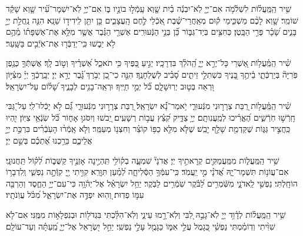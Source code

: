 \documentclass[twoside, openany, parskip=half, 11pt]{book}
\begin{document}
שִׁ֥יר הַֽמַּֽעֲל֗וֹת לִשְׁלֹ֫מֹ֥ה אִם־יְיָ֤ לֹֽא־יִבְנֶ֬ה בַ֗יִת שָׁ֤וְא עָֽמְֿל֣וּ בוֹנָ֣יו בּ֑וֹ אִם־יְיָ֥ לֹֽא־יִשְׁמָר־עִ֝֗יר שָׁ֤וְא שָׁקַ֬ד שׁוֹמֵֽר׃ שָׁ֤וְא לָכֶ֨ם מַשְׁכִּ֑ימֵי ק֡וּם מְאַֽחֲרֵי־שֶׁ֗בֶת אֹֽ֭כְֿלֵי לֶ֣חֶם הָֽעֲצָבִ֑ים כֵּ֤ן יִתֵּ֖ן לִֽידִיד֣וֹ שֵׁנָֽא׃ הִנֵּ֤ה נַֽחֲלַ֣ת יְיָ֣ בָּנִ֑ים שָׂ֝כָ֗ר פְּרִ֣י הַבָּֽטֶן׃ כְּחִצִּ֥ים בְּיַד־גִּבּ֑וֹר כֵּ֝֗ן בְּנֵ֣י הַנְּֿעוּרִֽים׃ אַשְׁרֵ֤י הַגֶּ֗בֶר אֲשֶׁ֤ר מִלֵּ֥א אֶת־אַשְׁפָּת֗וֹ מֵ֫הֶ֥ם לֹ֥א יֵב֑שׁוּ כִּֽי־יְדַבְּֿר֖וּ אֶת־אֹֽיְֿבִ֣ים בַּשָּֽׁעַר׃

 שִׁ֗יר הַֽמַּֽ֫עֲל֥וֹת אַ֭שְׁרֵי כָּל־יְרֵ֣א יְיָ֑ הַֽ֝הֹלֵ֗ךְ בִּדְרָכָֽיו׃ יְגִ֣יעַ כַּ֭פֶּיךָ כִּ֥י תֹאכֵ֑ל אַ֝שְׁרֶ֗יךָ וְט֣וֹב לָֽךְ׃ אֶשְׁתְּֿךָ֤ כְּגֶ֥פֶן פֹּֽרִיָּה֘ בְּיַרְכְּֿתֵ֢י בֵ֫יתֶ֥ךָ בָּ֭נֶיךָ כִּשְׁתִלֵ֣י זֵיתִ֑ים סָ֝בִ֗יב לְשֻׁלְחָנֶֽךָ׃ הִנֵּ֣ה כִי־כֵ֭ן יְבֹ֥רַךְ ֝גָּ֗בֶר יְרֵ֣א יְיָ׃ יְבָֽרֶכְֿךָ֥ יְיָ֗ מִצִּ֫יּ֥וֹן וּ֭רְאֵה בְּט֣וּב יְרֽוּשָׁלָ֑םִ כֹּ֝֗ל יְמֵ֣י חַיֶּֽיךָ׃ וּרְאֵֽה־בָנִ֥ים לְבָנֶ֑יךָ שָׁ֝ל֗וֹם עַל־יִשְׂרָאֵֽל׃

 שִׁ֗יר הַֽמַּֽ֫עֲל֥וֹת רַ֭בַּת צְרָר֣וּנִי מִנְּֿעוּרַ֑י יֹ֥אמַר־נָ֝֗א יִשְׂרָאֵֽל׃ רַ֭בַּת צְרָר֣וּנִי מִנְּֿעוּרָ֑י גַּ֝֗ם לֹ֣א יָכְֿלוּ־לִֽי׃ עַל־גַּ֭בִּי חָֽרְֿשׁ֣וּ חֹֽרְֿשִׁ֑ים הֶ֝אֱרִ֗יכוּ לְמַֽעֲנִותָֽם׃ יְיָ֥ צַדִּ֑יק קִ֝צֵּ֗ץ עֲב֣וֹת רְשָׁעִֽים׃ יֵ֭בשׁוּ וְיִסֹּגוּ֣ אָח֑וֹר כֹּ֝֗ל שֽׂנְֿאֵ֥י צִיּֽוֹן׃ יִֽ֭הְיוּ כַּֽחֲצִ֣יר גַּגּ֑וֹת שֶׁקַּדְמַ֖ת שָׁלַ֣ף יָבֵֽשׁ׃ שֶׁלֹּ֤א מִלֵּ֖א כַפּ֥וֹ קוֹצֵ֗ר וְחִצְנ֥וֹ מְעַמֵּֽר׃ וְלֹ֤א אָֽמְֿר֨וּ הָעֹֽבְֿרִ֗ים בִּרְכַּ֣ת יְיָ֣ אֲלֵיכֶ֑ם בֵּרַ֥כְנוּ אֶ֝תְכֶ֗ם בְּשֵׁ֣ם יְיָ׃

 שִׁ֥יר הַֽמַּֽעֲל֑וֹת מִמַּֽעֲמַקִּ֖ים קְרָאתִ֣יךָ יְיָ׃ אֲדֹנָי֘ שִׁמְעָ֢ה בְק֫וֹלִ֥י תִּֽהְיֶ֣ינָה אָזְנֶ֣יךָ קַשֻּׁב֑וֹת לְ֝ק֗וֹל תַּֽחֲנוּנָֽי׃ אִם־עֲוֹנ֥וֹת תִּשְׁמָר־יָ֑הּ אֲ֝דֹנָ֗י מִ֣י יַֽעֲמֹֽד׃ כִּֽי־עִמְּֿךָ֥ הַסְּֿלִיחָ֑ה לְ֝מַ֗עַן תִּוָּרֵֽא׃ קִוִּ֣יתִי יְ֖יָ קִוְּֿתָ֣ה נַפְשִׁ֑י וְֽלִדְבָר֥וֹ הוֹחָֽלְתִּי׃ נַפְשִׁ֣י לַֽאדֹנָ֑י מִשֹּֽֿׁמְרִ֥ים לַ֝בֹּ֗קֶר שֹֽׁמְֿרִ֥ים לַבֹּֽקֶר׃ יַחֵ֥ל יִשְׂרָאֵ֗ל אֶל־יְהֹ֫וָ֥ה כִּי־עִם־יְיָ֥ הַחֶ֑סֶד וְהַרְבֵּ֖ה עִמּ֣וֹ פְדֽוּת׃ וְ֭הֽוּא יִפְדֶּ֣ה אֶת־יִשְׂרָאֵ֑ל מִ֝כֹּ֗ל עֲוֹֽנֹתָֽיו׃

 שִׁ֥יר הַֽמַּֽעֲל֗וֹת לְדָ֫וִ֥ד יְיָ֤ לֹֽא־גָבַ֣הּ לִ֭בִּי וְלֹֽא־רָ֣מוּ עֵינַ֑י וְלֹֽא־הִלַּ֓כְתִּי בִּגְדֹל֖וֹת וּבְנִפְלָא֣וֹת מִמֶּֽנִּי׃ אִם־לֹ֤א שִׁוִּ֨יתִי וְדֽוֹמַ֗מְתִּי נַפְשִׁ֥֗י כְּ֭גָמֻל עֲלֵ֣י אִמּ֑וֹ כַּגָּמֻ֖ל עָלַ֣י נַפְשִֽׁי׃ יַחֵ֣ל יִ֭שְׂרָאֵל אֶל־יְיָ֑ מֵֽ֝עַתָּ֗ה וְעַד־עוֹלָֽם׃
\end{document}
